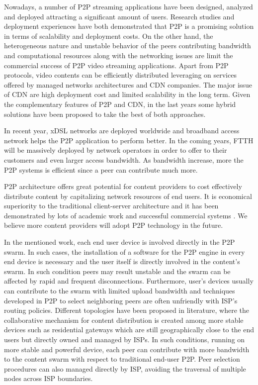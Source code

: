 \documentclass[paper]{ieice}
\begin{document}
Nowadays, a number of P2P streaming applications have been designed, analyzed and deployed attracting a significant amount of users.
Research studies and deployment experiences have both demonstrated that P2P is a promising solution in terms of scalability and deployment costs.
On the other hand, the heterogeneous nature and unstable behavior of the peers contributing bandwidth and computational resources along with the networking issues are limit the commercial success of P2P video streaming applications.
Apart from P2P protocols, video contents can be efficiently distributed leveraging on services offered by managed networks architectures and CDN companies.
The major issue of CDN are high deployment cost and limited scalability in the long term.
Given the complementary features of P2P and CDN, in the last years some hybrid solutions have been proposed \cite{Huang:2008:UHC:1496046.1496064,4772628,Yin:2009:DDH:1631272.1631279} to take the best of both approaches.

In recent year, xDSL networks are deployed worldwide and broadband access network helps the P2P application to perform better.
In the coming years, FTTH will be massively deployed by network operators in order to offer to their customers and even larger access bandwidth.
As bandwidth increase, more the P2P systems is efficient since a peer can contribute much more. 

P2P architecture offers great potential for content providers to cost effectively distribute content by capitalizing network resources of end users.
It is economical superiority to the traditional client-server architecture and it has been demonstrated by lots of academic work and successful commercial systems \cite{Yin:2009:DDH:1631272.1631279}.
We believe more content providers will adopt P2P technology in the future. 

In the mentioned work, each end user device is involved directly in the P2P swarm.
In such cases, the installation of a software for the P2P engine in every end device is necessary and the user itself is directly involved in the content's swarm.
In such condition peers may result unstable and the swarm can be affected by rapid and frequent disconnections.
Furthermore, user's devices usually can contribute to the swarm with limited upload bandwidth and techniques developed in P2P to select neighboring peers are often unfriendly with ISP's routing policies.
Different topologies have been proposed in literature, where the collaborative mechanism for content distribution is created among more stable devices such as residential gateways which are still geographically close to the end users but directly owned and managed by ISPs. 
In such conditions, running on more stable and powerful device, each peer can contribute with more bandwidth to the content swarm with respect to traditional end-user P2P. 
Peer selection procedures can also managed directly by ISP, avoiding the traversal of multiple nodes across ISP boundaries.
\end{document}
